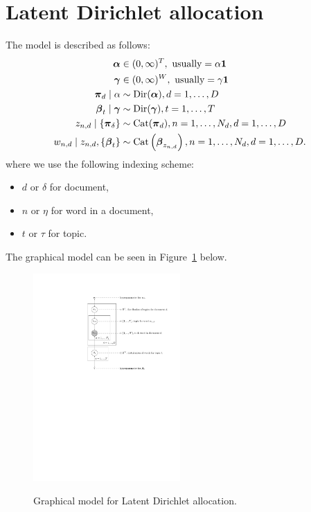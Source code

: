 \section{Latent Dirichlet allocation}
The model is described as follows:
\begin{align}
    \boldsymbol{\mathbf{\alpha}}                                 &\in (0, \infty)^T, \text{ usually} = \alpha\boldsymbol{\mathbf{1}} \\
    \boldsymbol{\mathbf{\gamma}}                                 &\in (0, \infty)^W, \text{ usually} = \gamma\boldsymbol{\mathbf{1}} \\
    \boldsymbol{\mathbf{\pi}}_d \mid \alpha                    &\sim \operatorname{Dir}(\boldsymbol{\mathbf{\alpha}}), d = 1, \dotsc, D \\
    \boldsymbol{\mathbf{\beta}}_t \mid \boldsymbol{\mathbf{\gamma}}             &\sim \operatorname{Dir}(\boldsymbol{\mathbf{\gamma}}), t = 1, \dotsc, T \\
    z_{n, d} \mid \{\boldsymbol{\mathbf{\pi}}_{\delta}\}        &\sim \operatorname{Cat}(\boldsymbol{\mathbf{\pi}}_d), n = 1, \dotsc, N_d, d = 1, \dotsc, D \\
    w_{n, d} \mid z_{n, d}, \{\boldsymbol{\mathbf{\beta}}_t\}  &\sim \operatorname{Cat}\left(\boldsymbol{\mathbf{\beta}}_{z_{n, d}}\right), n = 1, \dotsc, N_d, d = 1, \dotsc, D.
\end{align}
where we use the following indexing scheme:
\begin{itemize}
    \item $d$ or $\delta$ for document,
    \item $n$ or $\eta$ for word in a document,
    \item $t$ or $\tau$ for topic.
\end{itemize}
The graphical model can be seen in Figure~\ref{fig:models/lda/figures/lda} below.
\begin{figure}[htb!]
    \centering
        \includegraphics[width=0.5\textwidth]{models/lda/figures/lda}
    \label{fig:models/lda/figures/lda}
    \caption{Graphical model for Latent Dirichlet allocation.}
\end{figure}


